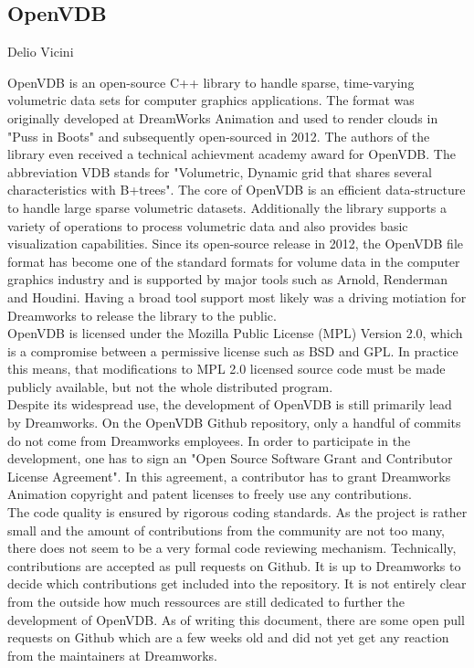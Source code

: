 \subsection{OpenVDB}{Delio Vicini}

OpenVDB is an open-source C++ library to handle sparse, time-varying volumetric data sets for computer graphics applications. The format was originally developed at DreamWorks Animation and used to render clouds in "Puss in Boots" and subsequently open-sourced in 2012.\cite{Museth.2013} The authors of the library even received a technical achievment academy award for OpenVDB.\cite{openvdb-about} The abbreviation VDB stands for "Volumetric, Dynamic grid that shares several characteristics with B+trees".\cite{Museth.2013} The core of OpenVDB is an efficient data-structure to handle large sparse volumetric datasets. Additionally the library supports a variety of operations to process volumetric data and also provides basic visualization capabilities. Since its open-source release in 2012, the OpenVDB file format has become one of the standard formats for volume data in the computer graphics industry and is supported by major tools such as Arnold, Renderman and Houdini.\cite{openvdb-about} Having a broad tool support most likely was a driving motiation for Dreamworks to release the library to the public.\\

OpenVDB is licensed under the Mozilla Public License (MPL) Version 2.0, which is a compromise between a permissive license such as BSD and GPL. In practice this means, that modifications to MPL 2.0 licensed source code must be made publicly available, but not the whole distributed program.\cite{mpl-faq} \\

Despite its widespread use, the development of OpenVDB is still primarily lead by Dreamworks. On the OpenVDB Github repository, only a handful of commits do not come from Dreamworks employees.\cite{openvdb-contribs} In order to participate in the development, one has to sign an "Open Source Software Grant and Contributor License Agreement".\cite{openvdb-agree} In this agreement, a contributor has to grant Dreamworks Animation copyright and patent licenses to freely use any contributions. \\

The code quality is ensured by rigorous coding standards.\cite{openvdb-code} As the project is rather small and the amount of contributions from the community are not too many, there does not seem to be a very formal code reviewing mechanism. Technically, contributions are accepted as pull requests on Github. It is up to Dreamworks to decide which contributions get included into the repository. It is not entirely clear from the outside how much ressources are still dedicated to further the development of OpenVDB. As of writing this document, there are some open pull requests on Github which are a few weeks old and did not yet get any reaction from the maintainers at Dreamworks. \\

